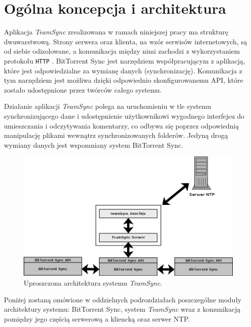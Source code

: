 \chapter{Ogólna koncepcja i architektura}

Aplikacja \emph{TeamSync} zrealizowana w ramach niniejszej pracy ma strukturę dwuwarstwową. Strony serwera oraz klienta, na wzór serwisów internetowych, są od siebie odizolowane, a komunikacja między nimi zachodzi z wykorzystaniem protokołu \texttt{HTTP} \cite{http} \cite{httparticle}. BitTorrent Sync jest narzędziem współpracującym z aplikacją, które jest odpowiedzialne za wymianę danych (synchronizację). Komunikacja z tym narzędziem jest możliwa dzięki odpowiednio skonfigurowanemu API, które zostało udostępnione przez twórców całego systemu.

Działanie aplikacji \emph{TeamSync} polega na uruchomieniu w tle systemu synchronizującego dane i udostępnienie użytkownikowi wygodnego interfejsu do umieszczania i odczytywania komentarzy, co odbywa się poprzez odpowiednią manipulację plikami wewnątrz synchronizowanych folderów. Jedyną drogą wymiany danych jest wspomniany system BitTorrent Sync.

\begin{figure}[htb]
  \vspace{5pt}
  \begin{center}
    \includegraphics[width=380pt]{figures/architecture3.png}
  \end{center}
  \caption{Uproszczona architektura systemu \emph{TeamSync}.}
  \label{architecturepic}
\end{figure}

Poniżej zostaną omówione w oddzielnych podrozdziałach poszczególne moduły architektury systemu: BitTorrent Sync, system \emph{TeamSync} wraz z komunikacją pomiędzy jego częścią serwerową a kliencką oraz serwer NTP.

